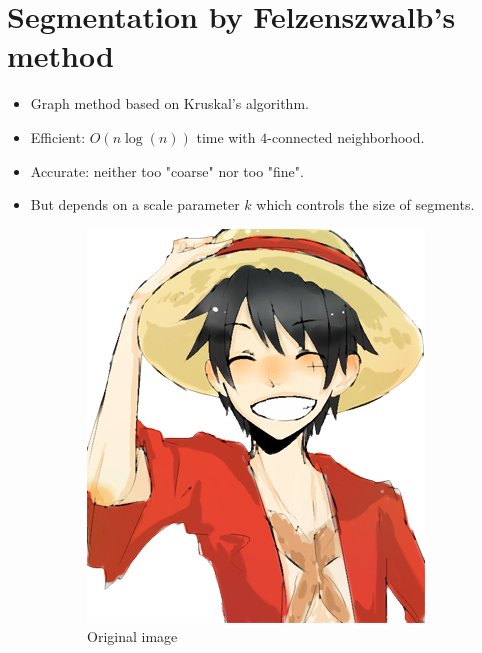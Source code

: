 \documentclass{beamer}
\begin{document}
\section{Segmentation by Felzenszwalb's method}

\begin{frame}
\begin{itemize}
\item Graph method based on Kruskal's algorithm.
\item Efficient: $O(n\log(n))$ time with $4$-connected neighborhood.
\item Accurate: neither too "coarse" nor too "fine".
\item But depends on a scale parameter $k$ which controls the size of segments.
\end{itemize}

\begin{figure}[htb!]
\centering
\begin{subfigure}{.3\textwidth}
\includegraphics[width=\textwidth]{../images/rufy_d.png}
\caption{Original image}
\end{subfigure}
\begin{subfigure}{.3\textwidth}

\end{subfigure}
\end{figure}
\end{frame}
\end{document}
